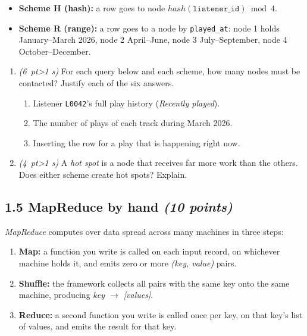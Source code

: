 \documentclass[11pt]{article}
\newcommand{\code}[1]{\texttt{#1}}
\newcommand{\pts}[1]{\hfill\textit{(#1 points)}}
\newcommand{\pt}[1]{\textit{(#1~pt\ifnum#1>1 s\fi)}}
\begin{document}
\begin{itemize}
  \item \textbf{Scheme H (hash):} a row goes to node
        $\mathit{hash}(\code{listener\_id}) \bmod 4$.
  \item \textbf{Scheme R (range):} a row goes to a node by \code{played\_at}:
        node 1 holds January--March 2026, node 2 April--June, node 3
        July--September, node 4 October--December.
\end{itemize}

\begin{enumerate}[label=(\alph*)]
  \item \pt{6} For each query below and each scheme, how many nodes must be
  contacted? Justify each of the six answers.
  \begin{enumerate}[label=\arabic*.]
    \item Listener \code{L0042}'s full play history (\emph{Recently played}).
    \item The number of plays of each track during March 2026.
    \item Inserting the row for a play that is happening right now.
  \end{enumerate}

  \item \pt{4} A \emph{hot spot} is a node that receives far more work than the
  others. Does either scheme create hot spots? Explain.

\end{enumerate}

\subsection*{1.5 MapReduce by hand \pts{10}}

\emph{MapReduce} computes over data spread across many machines in three steps:
\begin{enumerate}[nosep]
  \item \textbf{Map:} a function you write is called on each input record, on
  whichever machine holds it, and emits zero or more \emph{(key, value)} pairs.
  \item \textbf{Shuffle:} the framework collects all pairs with the same key
  onto the same machine, producing \emph{key $\rightarrow$ [values]}.
  \item \textbf{Reduce:} a second function you write is called once per key, on
  that key's list of values, and emits the result for that key.
\end{enumerate}
\end{document}
